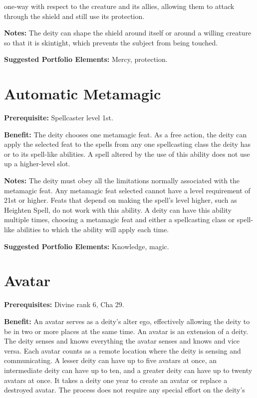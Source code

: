 \documentclass{article}
\begin{document}
one-way with respect to the creature and its allies, allowing them to attack through 
the shield and still use its protection.

\textbf{Notes:} The deity can shape the shield around itself or around a willing 
creature so that it is skintight, which prevents the subject from being touched.

\textbf{Suggested Portfolio Elements:} Mercy, protection.

\vspace{12pt}
\section*{Automatic Metamagic}

\textbf{Prerequisite:} Spellcaster level 1st.

\textbf{Benefit:} The deity chooses one metamagic feat. As a free action, the deity 
can apply the selected feat to the spells from any one spellcasting class the deity 
has or to its spell-like abilities. A spell altered by the use of this ability 
does not use up a higher-level slot.

\textbf{Notes:} The deity must obey all the limitations normally associated with 
the metamagic feat. Any metamagic feat selected cannot have a level requirement 
of 21st or higher. Feats that depend on making the spell's level higher, such as 
Heighten Spell, do not work with this ability. A deity can have this ability multiple 
times, choosing a metamagic feat and either a spellcasting class or spell-like 
abilities to which the ability will apply each time.

\textbf{Suggested Portfolio Elements:} Knowledge, magic.

\vspace{12pt}
\section*{Avatar}

\textbf{Prerequisites:} Divine rank 6, Cha 29.

\textbf{Benefit:} An avatar serves as a deity's alter ego, effectively allowing 
the deity to be in two or more places at the same time. An avatar is an extension 
of a deity. The deity senses and knows everything the avatar senses and knows and 
vice versa. Each avatar counts as a remote location where the deity is sensing 
and communicating. A lesser deity can have up to five avatars at once, an intermediate 
deity can have up to ten, and a greater deity can have up to twenty avatars at 
once. It takes a deity one year to create an avatar or replace a destroyed avatar. 
The process does not require any special effort on the deity's
\end{document}
